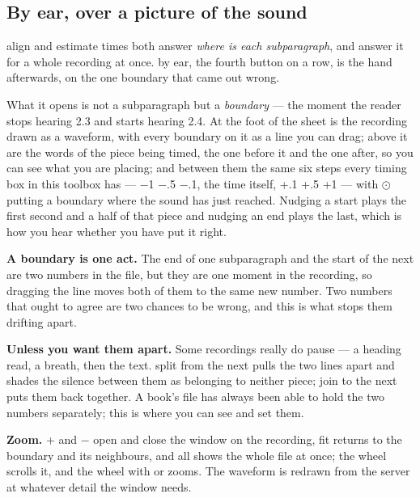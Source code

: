 \documentclass[11pt,oneside]{report}
\newcommand{\key}[1]{\textsf{\small\fbox{#1}}}
\newcommand{\menu}[1]{\textsf{#1}}
\begin{document}
\subsection*{By ear, over a picture of the sound}
\label{sec:byear}

\menu{align} and \menu{estimate times} both answer \emph{where is each
subparagraph}, and answer it for a whole recording at once. \menu{by ear},
the fourth button on a row, is the hand afterwards, on the one boundary that
came out wrong.

What it opens is not a subparagraph but a \emph{boundary} --- the moment the
reader stops hearing 2.3 and starts hearing 2.4. At the foot of the sheet is
the recording drawn as a waveform, with every boundary on it as a line you
can drag; above it are the words of the piece being timed, the one before it
and the one after, so you can see what you are placing; and between them the
same six steps every timing box in this toolbox has --- \textsf{−1 −.5 −.1},
the time itself, \textsf{+.1 +.5 +1} --- with $\odot$ putting a boundary
where the sound has just reached. Nudging a start plays the first second and
a half of that piece and nudging an end plays the last, which is how you
hear whether you have put it right.

\textbf{A boundary is one act.} The end of one subparagraph and the start of
the next are two numbers in the file, but they are one moment in the
recording, so dragging the line moves both of them to the same new number.
Two numbers that ought to agree are two chances to be wrong, and this is
what stops them drifting apart.

\textbf{Unless you want them apart.} Some recordings really do pause --- a
heading read, a breath, then the text. \menu{split from the next} pulls the
two lines apart and shades the silence between them as belonging to neither
piece; \menu{join to the next} puts them back together. A book's file has
always been able to hold the two numbers separately; this is where you can
see and set them.

\textbf{Zoom.} \textsf{+} and \textsf{−} open and close the window on the
recording, \menu{fit} returns to the boundary and its neighbours, and
\menu{all} shows the whole file at once; the wheel scrolls it, and the wheel
with \key{Shift} or \key{Ctrl} zooms. The waveform is redrawn from the
server at whatever detail the window needs.
\end{document}
